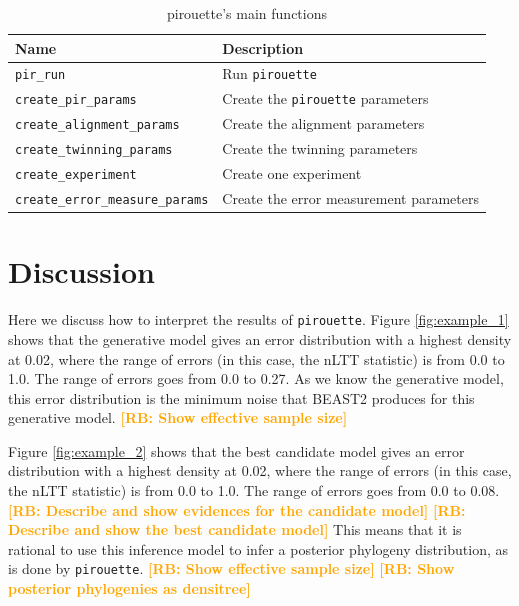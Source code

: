 \documentclass{article}
\newcommand{\richel}[1]{\textcolor{orange}{\textbf{[RB: #1]}}}
\begin{document}
\begin{table}[h]
\centering
\begin{tabular}{ | l | l | }
\hline
\textbf{Name} & \textbf{Description} \\
\hline
\verb;pir_run; & Run \verb;pirouette; \\
\verb;create_pir_params; & Create the \verb;pirouette; parameters \\
\hline
\verb;create_alignment_params; & Create the alignment parameters \\
\verb;create_twinning_params; & Create the twinning parameters \\
\verb;create_experiment; & Create one experiment \\
\verb;create_error_measure_params; & Create the error measurement parameters \\
\hline
\end{tabular}
\caption{pirouette's main functions}
\label{tab:functions}
\end{table}

\section{Discussion}

Here we discuss how to interpret the results of \verb;pirouette;.
Figure \ref{fig:example_1} shows that the generative model 
gives an error distribution with a highest density at 0.02,
where the range of errors (in this case, the nLTT statistic) is from 0.0 to 1.0.
The range of errors goes from 0.0 to 0.27. As we know the generative model,
this error distribution is the minimum noise that BEAST2 produces for this
generative model.
\richel{Show effective sample size}

Figure \ref{fig:example_2} shows that the best candidate model 
gives an error distribution with a highest density at 0.02,
where the range of errors (in this case, the nLTT statistic) is from 0.0 to 1.0.
The range of errors goes from 0.0 to 0.08. 
\richel{Describe and show evidences for the candidate model}
\richel{Describe and show the best candidate model}
This means that it is rational to use this inference model to 
infer a posterior phylogeny distribution, 
as is done by \verb;pirouette;.
\richel{Show effective sample size}
\richel{Show posterior phylogenies as densitree}
\end{document}
